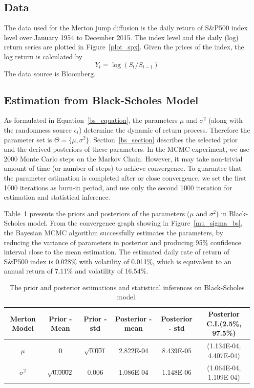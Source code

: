 \documentclass[11pt,reqno,final]{amsart}
\begin{document}
\subsection{Data}
The data used for the Merton jump diffusion is the daily return of S\&P500 index level over January 1954 to December 2015. The index level and the daily (log) return series are plotted in Figure~\ref{plot_spx}. Given the prices of the index, the log return is calculated by
$$
Y_t = \log(S_{t}/S_{t-1})
$$
The data source is Bloomberg.

\subsection{Estimation from Black-Scholes Model}
As formulated in Equation~\ref{bs_equation}, the parameters $\mu$ and $\sigma^2$ (along with the randomness source $\epsilon_t$) determine the dynamic of return process. Therefore the parameter set is $\Theta=\{\mu, \sigma^2\}$. Section~\ref{bs_section} describes the selected prior and the derived posteriors of these parameters. In the MCMC experiment, we use 2000 Monte Carlo steps on the Markov Chain. However, it may take non-trivial amount of time (or number of steps) to achieve convergence. To guarantee that the parameter estimation is completed after or close convergence, we set the first 1000 iterations as burn-in period, and use only the second 1000 iteration for estimation and statistical inference.

Table~\ref{tbl::bs_est} presents the priors and posteriors of the parameters ($\mu$ and $\sigma^2$) in Black-Scholes model. From the convergence graph showing in Figure~\ref{mu_sigma_bs}, the Bayesian MCMC algorithm successfully estimates the parameters, by reducing the variance of parameters in posterior and producing 95\% confidence interval close to the mean estimation. The estimated daily rate of return of S\&P500 index is 0.028\% with volatility of 0.011\%, which is equivalent to an annual return of 7.11\% and volatility of 16.54\%.

\begin{table}
\begin{center}
\caption{The prior and posterior estimations and statistical inferences on Black-Scholes model.}
\begin{tabular}{|c|c|c|c|c|c|}
  \hline
Merton Model	&	Prior - Mean	&	Prior - std	&	Posterior - mean	&	Posterior - std	&	Posterior C.I.(2.5\%, 97.5\%)	\\ \hline
$\mu$	&	0	&	$\sqrt{0.001}$	&	2.822E-04	&	8.439E-05	&	(1.134E-04, 4.407E-04)	\\
$\sigma^2$	&	$\sqrt{0.0002}$	&	0.006	&	1.086E-04	&	1.148E-06	&	(1.064E-04, 1.109E-04)	\\
  \hline
\end{tabular}\label{tbl::bs_est}
\end{center}
\end{table}
\end{document}
